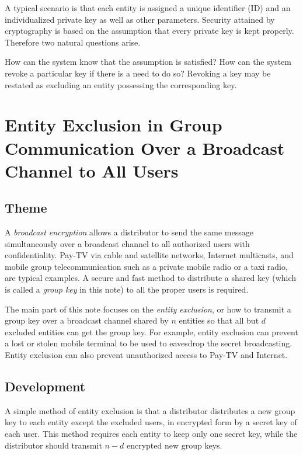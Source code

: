 \documentclass{ims9x6}
\begin{document}
A typical scenario is that each entity is assigned a
unique identifier (ID) and an individualized private key as well as
other parameters. Security attained by cryptography is based on the
assumption that every private key is kept
properly. Therefore two natural questions arise.

How can the system know that the assumption is satisfied?  How can the
system revoke a particular key if there is a need to do
so?  Revoking a key may be restated as excluding an entity possessing
the corresponding key.

\section{Entity Exclusion in Group Communication
Over a Broadcast Channel to All Users}
\subsection{Theme}
A {\em broadcast encryption\/} allows a distributor to send the same
message \hbox{simultaneously} over a broadcast channel to all
authorized users with confidentiality. Pay-TV via cable
and satellite networks,
Internet multicasts, and mobile
group telecommunication such as a private mobile radio
or a taxi radio, are typical examples.  A secure and fast method to
distribute a shared key (which is called a {\em group key}
in this note) to all the proper users is required.

The main part of this note focuses on
the {\em entity exclusion}, or how to transmit a group key over
a broadcast channel
shared by $n$ entities so that all but $d$ excluded entities
can get the group key. For example, entity exclusion can prevent a
lost or stolen mobile terminal to be used to
eavesdrop the secret broadcasting. Entity
exclusion can also prevent unauthorized access to Pay-TV and Internet.

\subsection{Development}
A simple method of entity exclusion is that a distributor distributes
a new group key to each entity except the excluded users, in encrypted
form by a secret key of each user.  This method requires
each entity to keep only one secret key, while the distributor should
transmit $n-d$ encrypted new group keys.
\end{document}
